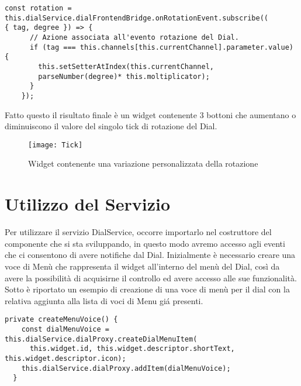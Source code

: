 \vspace{1.0cm}
\begin{lstlisting}[caption={Utilizzo del moltiplicatore},style=javaScriptCode]
const rotation = 
this.dialService.dialFrontendBridge.onRotationEvent.subscribe((
{ tag, degree }) => {
      // Azione associata all'evento rotazione del Dial.
      if (tag === this.channels[this.currentChannel].parameter.value) {
        this.setSetterAtIndex(this.currentChannel, 
        parseNumber(degree)* this.moltiplicator);
      }
    });
\end{lstlisting} 
\vspace{1.0cm}
Fatto questo il risultato finale è un widget contenente 3 bottoni che aumentano o diminuiscono il valore del singolo tick di rotazione del Dial.
\begin{figure}[htpb!]
\center
  \texttt{[image: Tick]}
  \caption{Widget contenente una variazione personalizzata della rotazione}
\end{figure}



\section{Utilizzo del Servizio}

Per utilizzare il servizio DialService, occorre importarlo nel costruttore del componente che si sta sviluppando, in questo modo avremo accesso agli eventi che ci consentono di avere notifiche dal Dial.
Inizialmente è necessario creare una voce di Menù che rappresenta il widget all’interno del menù del Dial, così da avere la possibilità di acquisirne il controllo ed avere accesso alle sue funzionalità.
Sotto è riportato un esempio di creazione di una voce di menù per il dial con la relativa aggiunta alla lista di voci di Menu giá presenti.

\vspace{1.0cm}
\begin{lstlisting}[caption={Creazione nuova voce da widget},style=javaScriptCode]
  private createMenuVoice() {
    const dialMenuVoice = this.dialService.dialProxy.createDialMenuItem(
      this.widget.id, this.widget.descriptor.shortText, this.widget.descriptor.icon);
    this.dialService.dialProxy.addItem(dialMenuVoice);
  }
\end{lstlisting} 
\vspace{1.0cm}


